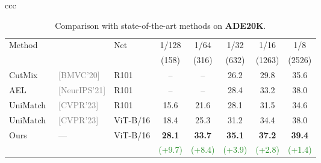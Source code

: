 \documentclass[10pt,twocolumn,letterpaper]{article}
\newcommand{\green}[1]{\textcolor{ForestGreen}{#1}}
\newcommand{\venue}[1]{{\tiny\textcolor{gray}{[#1]}}}
\begin{document}
\begin{figure*}
\begin{tabular}{ccc}
\begin{table}
\centering
\caption{Comparison with state-of-the-art methods on \textbf{ADE20K}.}
\label{tab:sota_ade}
\scriptsize
\setlength{\tabcolsep}{3pt}
\begin{tabular}{lllccccc}
\toprule
\multirow{2}{*}{Method} &                &     \multirow{2}{*}{Net} &     1/128 &    1/64 &    1/32 &    1/16 & 1/8 \\
   & & & (158) & (316) & (632) & (1263) & (2526) \\ 
\midrule
                CutMix~\cite{french2019semi} &                        \venue{BMVC'20} &                      R101 &             -- &             -- &           26.2 &           29.8 &           35.6 \\
                       AEL~\cite{hu2021semi} &                     \venue{NeurIPS'21} &                      R101 &             -- &             -- &           28.4 &           33.2 &           38.0 \\
          UniMatch~\cite{yang2023revisiting} &                        \venue{CVPR'23} &                      R101 &           15.6 &           21.6 &           28.1 &           31.5 &           34.6 \\
\midrule
UniMatch~\cite{yang2023revisiting} &                        \venue{CVPR'23} &                  ViT-B/16 &           18.4 &           25.3 &           31.2 &           34.4 &           38.0 \\
\multirow{2}{*}{Ours} & \multirow{2}{*}{\textcolor{gray}{---}} & \multirow{2}{*}{ViT-B/16} &           \textbf{28.1} &           \textbf{33.7} &           \textbf{35.1} &           \textbf{37.2} &           \textbf{39.4} \\
                                             &                                        &                           & \green{(+9.7)} & \green{(+8.4)} & \green{(+3.9)} & \green{(+2.8)} & \green{(+1.4)} \\


\end{tabular}
\end{table}
\end{tabular}
\end{figure*}
\end{document}
